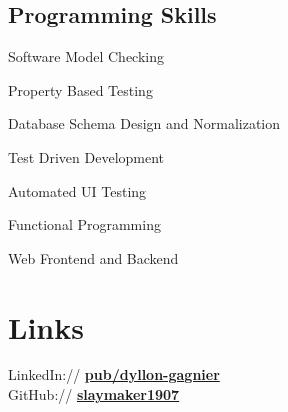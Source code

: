 \documentclass[letterpaper]{deedy-resume} %
\begin{document}
\begin{minipage}[t]{0.35\textwidth}
\subsection{Programming Skills}
\begin{tightitemize}
\vspace{\topsep} %
\item Software Model Checking
\item Property Based Testing
\item Database Schema Design and Normalization
\item Test Driven Development
\item Automated UI Testing
\item Functional Programming
\item Web Frontend and Backend
\end{tightitemize}

\sectionspace %


\section{Links}

LinkedIn:// \href{http://www.linkedin.com/pub/dyllon-gagnier/2a/6b3/808/}{\bf pub/dyllon-gagnier} \\
GitHub:// \href{https://github.com/}{\bf slaymaker1907} \\

\sectionspace %


\end{minipage} %
\hfill
%
%
\end{document}
